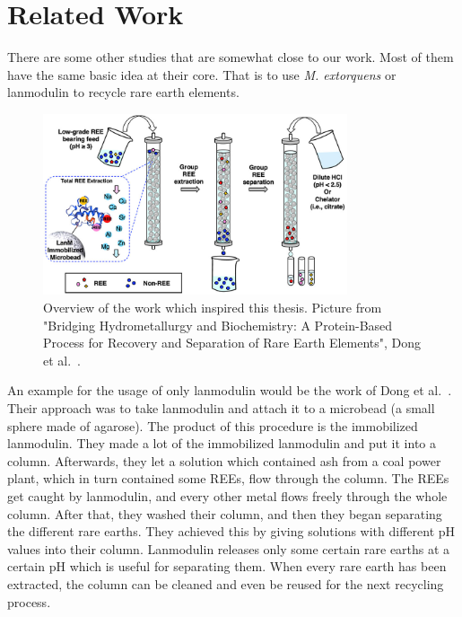 \chapter{Related Work\authorA{}}

There are some other studies that are somewhat close to our work.
Most of them have the same basic idea at their core.
That is to use \emph{M. extorquens} or lanmodulin to recycle rare earth elements.

\begin{figure}[H]
    \centering
    \includegraphics[width=0.8\textwidth]{./media/images/original_study_process}
    \caption{Overview of the work which inspired this thesis.
    Picture from "Bridging Hydrometallurgy and Biochemistry:
    A Protein-Based Process for Recovery and Separation of Rare Earth Elements", Dong et al.~\cite{originalstudy}.}
    \label{fig:original_study_process}
\end{figure}

An example for the usage of only lanmodulin would be the work of Dong et al.~\cite{originalstudy}.
Their approach was to take lanmodulin and attach it to a microbead (a small sphere made of agarose).
The product of this procedure is the immobilized lanmodulin.
They made a lot of the immobilized lanmodulin and put it into a column.
Afterwards, they let a solution which contained ash from a coal power plant, which in turn contained some REEs, flow through the column.
The REEs get caught by lanmodulin, and every other metal flows freely through the whole column.
After that, they washed their column, and then they began separating the different rare earths.
They achieved this by giving solutions with different pH values into their column.
Lanmodulin releases only some certain rare earths at a certain pH which is useful for separating them.
When every rare earth has been extracted, the column can be cleaned and even be reused for the next recycling process.

